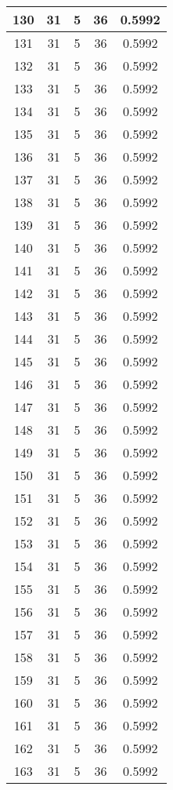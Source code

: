 \documentclass[letterpaper, 12pt]{article}
\begin{document}
\begin{longtable}{|c|c|c|c|c|}
\hline
130 & 31 & 5 & 36 & 0.5992 \\
\hline
131 & 31 & 5 & 36 & 0.5992 \\
\hline
132 & 31 & 5 & 36 & 0.5992 \\
\hline
133 & 31 & 5 & 36 & 0.5992 \\
\hline
134 & 31 & 5 & 36 & 0.5992 \\
\hline
135 & 31 & 5 & 36 & 0.5992 \\
\hline
136 & 31 & 5 & 36 & 0.5992 \\
\hline
137 & 31 & 5 & 36 & 0.5992 \\
\hline
138 & 31 & 5 & 36 & 0.5992 \\
\hline
139 & 31 & 5 & 36 & 0.5992 \\
\hline
140 & 31 & 5 & 36 & 0.5992 \\
\hline
141 & 31 & 5 & 36 & 0.5992 \\
\hline
142 & 31 & 5 & 36 & 0.5992 \\
\hline
143 & 31 & 5 & 36 & 0.5992 \\
\hline
144 & 31 & 5 & 36 & 0.5992 \\
\hline
145 & 31 & 5 & 36 & 0.5992 \\
\hline
146 & 31 & 5 & 36 & 0.5992 \\
\hline
147 & 31 & 5 & 36 & 0.5992 \\
\hline
148 & 31 & 5 & 36 & 0.5992 \\
\hline
149 & 31 & 5 & 36 & 0.5992 \\
\hline
150 & 31 & 5 & 36 & 0.5992 \\
\hline
151 & 31 & 5 & 36 & 0.5992 \\
\hline
152 & 31 & 5 & 36 & 0.5992 \\
\hline
153 & 31 & 5 & 36 & 0.5992 \\
\hline
154 & 31 & 5 & 36 & 0.5992 \\
\hline
155 & 31 & 5 & 36 & 0.5992 \\
\hline
156 & 31 & 5 & 36 & 0.5992 \\
\hline
157 & 31 & 5 & 36 & 0.5992 \\
\hline
158 & 31 & 5 & 36 & 0.5992 \\
\hline
159 & 31 & 5 & 36 & 0.5992 \\
\hline
160 & 31 & 5 & 36 & 0.5992 \\
\hline
161 & 31 & 5 & 36 & 0.5992 \\
\hline
162 & 31 & 5 & 36 & 0.5992 \\
\hline
163 & 31 & 5 & 36 & 0.5992 \\

\end{longtable}
\end{document}
